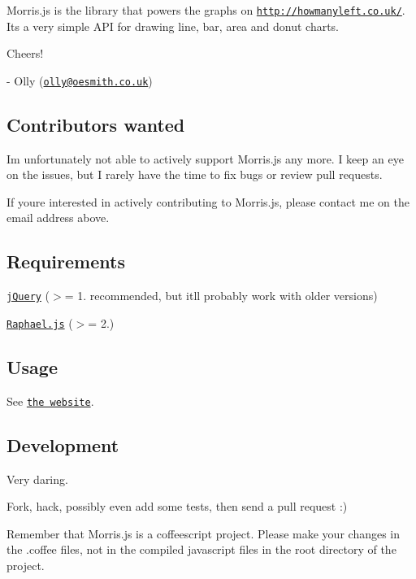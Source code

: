 \href{http://travis-ci.org/morrisjs/morris.js}{\tt }

Morris.\+js is the library that powers the graphs on \href{http://howmanyleft.co.uk/}{\tt http\+://howmanyleft.\+co.\+uk/}. It\textquotesingle{}s a very simple A\+PI for drawing line, bar, area and donut charts.

Cheers!

-\/ Olly (\href{mailto:olly@oesmith.co.uk}{\tt olly@oesmith.\+co.\+uk})

\subsection*{Contributors wanted}

I\textquotesingle{}m unfortunately not able to actively support Morris.\+js any more. I keep an eye on the issues, but I rarely have the time to fix bugs or review pull requests.

If you\textquotesingle{}re interested in actively contributing to Morris.\+js, please contact me on the email address above.

\subsection*{Requirements}


\begin{DoxyItemize}
\item \href{http://jquery.com/}{\tt j\+Query} ($>$= 1. recommended, but it\textquotesingle{}ll probably work with older versions)
\item \href{http://raphaeljs.com/}{\tt Raphael.\+js} ($>$= 2.)
\end{DoxyItemize}

\subsection*{Usage}

See \href{http://morrisjs.github.com/morris.js/}{\tt the website}.

\subsection*{Development}

Very daring.

Fork, hack, possibly even add some tests, then send a pull request \+:)

Remember that Morris.\+js is a coffeescript project. Please make your changes in the {\ttfamily .coffee} files, not in the compiled javascript files in the root directory of the project.

